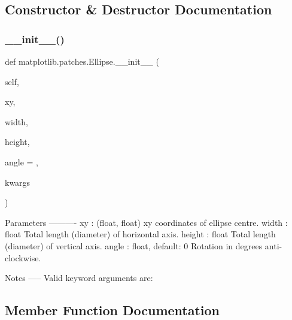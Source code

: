 \subsection{Constructor \& Destructor Documentation}
\mbox{\label{classmatplotlib_1_1patches_1_1Ellipse_a9f85b749219fb8d351202891fdf71b24}} 
\subsubsection{\texorpdfstring{\+\_\+\+\_\+init\+\_\+\+\_\+()}{\_\_init\_\_()}}
{\footnotesize\ttfamily def matplotlib.\+patches.\+Ellipse.\+\_\+\+\_\+init\+\_\+\+\_\+ (\begin{DoxyParamCaption}\item[{}]{self,  }\item[{}]{xy,  }\item[{}]{width,  }\item[{}]{height,  }\item[{}]{angle = {},  }\item[{}]{kwargs }\end{DoxyParamCaption})}

\begin{DoxyVerb}Parameters
----------
xy : (float, float)
    xy coordinates of ellipse centre.
width : float
    Total length (diameter) of horizontal axis.
height : float
    Total length (diameter) of vertical axis.
angle : float, default: 0
    Rotation in degrees anti-clockwise.

Notes
-----
Valid keyword arguments are:

\end{DoxyVerb}
 

\subsection{Member Function Documentation}
\mbox{\label{classmatplotlib_1_1patches_1_1Ellipse_a17aec80c0dbad8761ea0dace99769fff}} 
